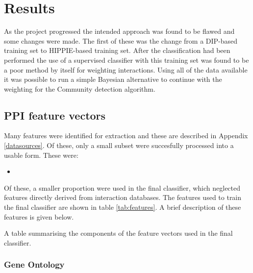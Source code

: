 \chapter{Results}
\label{results}


As the project progressed the intended approach was found to be flawed and some changes were made.
The first of these was the change from a DIP-based training set to HIPPIE-based training set.
After the classification had been performed the use of a supervised classifier with this training set was found to be a poor method by itself for weighting interactions.
Using all of the data available it was possible to run a simple Bayesian alternative to continue with the weighting for the Community detection algorithm.

\section{PPI feature vectors}

Many features were identified for extraction and these are described in Appendix \ref{datasources}.
Of these, only a small subset were succesfully processed into a usable form.
These were:

\begin{itemize}
    \item
\end{itemize}

Of these, a smaller proportion were used in the final classifier, which neglected features directly derived from interaction databases.
The features used to train the final classifier are shown in table \ref{tab:features}.
A brief description of these features is given below.

\begin{table}
    \centering
    \caption{A table summarising the components of the feature vectors used in the final classifier.}
    \label{tab:features}
\end{table}

\subsection{Gene Ontology}

